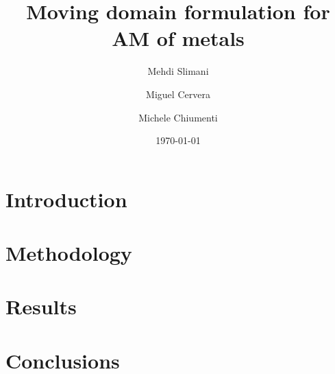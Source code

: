 \documentclass{article}
\title{Moving domain formulation for AM of metals}
\author{Mehdi Slimani \and Miguel Cervera \and Michele Chiumenti}
\date{\today}
\begin{document}
\maketitle

\begin{abstract}
  
\end{abstract}

\section{Introduction}\label{sec:intro}


\section{Methodology}\label{sec:methodman}


\section{Results}\label{sec:results}


\section{Conclusions}\label{sec:conclusions}




\end{document}
